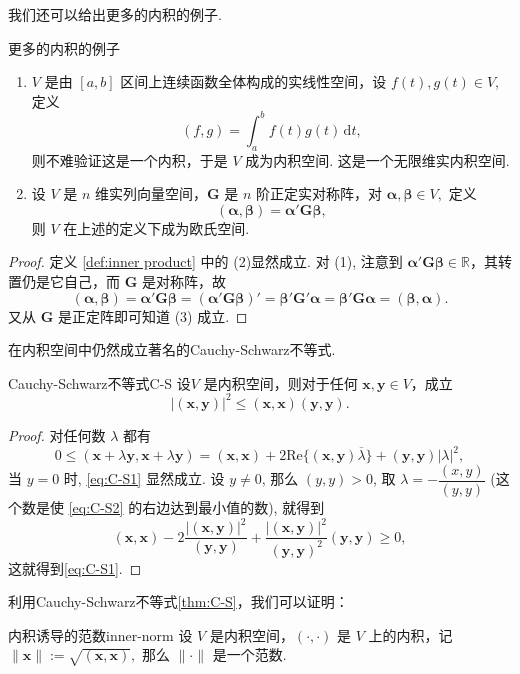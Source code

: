 \documentclass[12pt, a4paper,newtx]{ctexart}
\begin{document}
	我们还可以给出更多的内积的例子. 
	\begin{example}{更多的内积的例子}{}
		\begin{enumerate}
			\item  $V$ 是由 $[a,b]$ 区间上连续函数全体构成的实线性空间，设 $f(t), g(t) \in V$, 定义
			\[
			(f, g) = \int_a^b f(t) g(t) \,\mathrm dt,
			\]
			则不难验证这是一个内积，于是 $V$ 成为内积空间. 这是一个无限维实内积空间.  
			\item 设 $V$ 是 $n$ 维实列向量空间，$\bm G$ 是 $n$ 阶正定实对称阵，对 $\bm\alpha, \bm\beta \in V,$ 定义
			\[
			(\bm\alpha, \bm\beta) = \bm\alpha' \bm G \bm\beta,
			\]
			则 $V$ 在上述的定义下成为欧氏空间. 
		\end{enumerate}
	\end{example}
	\begin{proof}
		定义 \ref{def:inner product} 中的 (2)显然成立. 对 (1), 注意到 $\bm\alpha' \bm G \bm \beta \in\mathbb R$，其转置仍是它自己，而 $\bm G$ 是对称阵，故
		\[
		(\bm\alpha, \bm\beta) = \bm\alpha' \bm{G \beta} = (\bm\alpha' \bm{G \beta})' = \bm\beta' \bm G' \bm\alpha = \bm\beta' \bm{G \alpha} = (\bm \beta, \bm \alpha).
		\]
		又从 $\bm G$ 是正定阵即可知道 (3) 成立. 
	\end{proof}
在内积空间中仍然成立著名的Cauchy-Schwarz不等式. 
\begin{theorem}{Cauchy-Schwarz不等式}{C-S}
	设$V$ 是内积空间，则对于任何 $\bm x, \bm y \in V$，成立\begin{equation}\label{eq:C-S1}
		|(\bm x, \bm y)|^2 \leqslant (\bm x, \bm x)(\bm y, \bm y). 
	\end{equation}
\end{theorem}
\begin{proof}
	对任何数 $\lambda$ 都有
	\begin{equation}\label{eq:C-S2}
		0 \leqslant (\bm x + \lambda \bm y, \bm x + \lambda\bm y) = (\bm x, \bm x) + 2 \text{Re}\{(\bm x, \bm y) \overline{\lambda}\} + (\bm y, \bm y) |\lambda|^2, 
	\end{equation}
	当 $y = 0$ 时, \eqref{eq:C-S1} 显然成立. 设 $y \neq 0$, 那么 $(y, y) > 0$, 取 $\lambda = -\dfrac{(x, y)}{(y, y)}$ (这个数是使 \eqref{eq:C-S2} 的右边达到最小值的数), 就得到
	\[
	(\bm x, \bm x) - 2 \frac{|(\bm x, \bm y)|^2}{(\bm y,\bm y)} + \frac{|(\bm x, \bm y)|^2}{(\bm y,\bm y)^2} (\bm y, \bm y) \geqslant 0,
	\]
	这就得到\eqref{eq:C-S1}.
\end{proof}
利用Cauchy-Schwarz不等式\ref{thm:C-S}，我们可以证明：
\begin{theorem}{内积诱导的范数}{inner-norm}
	设 $V$ 是内积空间，$(·,·)$ 是 $V$ 上的内积，记 $\|\bm x\|:= \sqrt{(\bm x, \bm x)},$ 那么 $\|·\|$ 是一个范数. 
\end{theorem}
\end{document}
